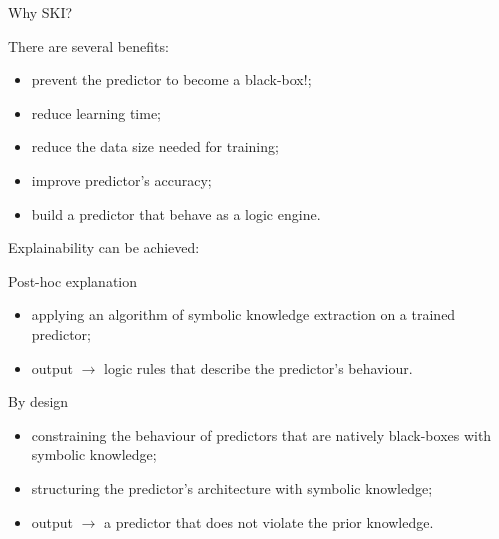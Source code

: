 \documentclass[presentation]{beamer}\mode<presentation>{\usetheme{AMSBolognaFC}}
\begin{document}
\begin{frame}[allowframebreaks]{Why SKI?}
    \begin{block}{There are several benefits:}
        \begin{itemize}
            \item prevent the predictor to become a black-box\alert{!};
            \item reduce learning time;
            \item reduce the data size needed for training;
            \item improve predictor's accuracy;
            \item build a predictor that behave as a logic engine.
        \end{itemize}
    \end{block}

     \framebreak

    Explainability  can be achieved:
    \begin{block}{Post-hoc explanation}
        \begin{itemize}
            \item applying an algorithm of symbolic knowledge extraction on a trained predictor;
            \item output $\rightarrow$ logic rules that describe the predictor's behaviour.
        \end{itemize}    
    \end{block}
    
    \begin{block}{By design}
        \begin{itemize}
            \item constraining the behaviour of predictors that are natively black-boxes with symbolic knowledge;
            \item structuring the predictor's architecture with symbolic knowledge;
            \item output $\rightarrow$ a predictor that does not violate the prior knowledge.
        \end{itemize}
    \end{block}
    
\end{frame}
\end{document}
